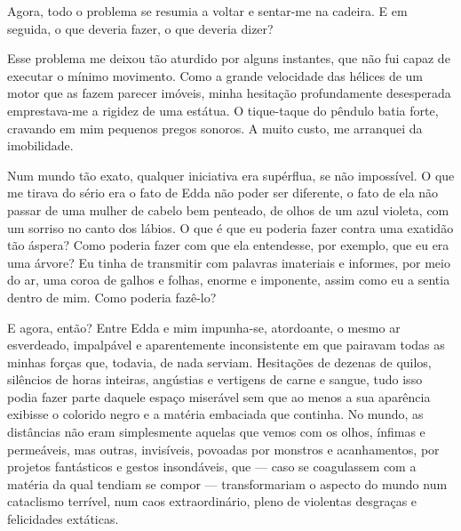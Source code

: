Agora, todo o problema se resumia a voltar e sentar-me na cadeira. E em
seguida, o que deveria fazer, o que deveria dizer?

Esse problema me deixou tão aturdido por alguns instantes, que não fui capaz
 de executar o mínimo movimento. Como a grande velocidade das hélices de um
 motor que as fazem parecer imóveis, minha hesitação profundamente desesperada
 emprestava-me a rigidez de uma estátua. O tique-taque do pêndulo batia forte,
 cravando em mim pequenos pregos sonoros. A muito custo, me arranquei da
 imobilidade. 


Num mundo tão exato, qualquer iniciativa era supérflua, se não impossível. O
que me tirava do sério era o fato de Edda não poder ser diferente, o fato de
ela não passar de uma mulher de cabelo bem penteado, de olhos de um azul
violeta, com um sorriso no canto dos lábios. O que é que eu poderia fazer
contra uma exatidão tão áspera? Como poderia fazer com que ela entendesse,
por exemplo, que eu era uma árvore? Eu tinha de transmitir com palavras
imateriais e informes, por meio do ar, uma coroa de galhos e folhas, enorme e
imponente, assim como eu a sentia dentro de mim. Como poderia fazê-lo?


E agora, então? Entre Edda e mim impunha-se, atordoante, o mesmo ar
esverdeado, impalpável e aparentemente inconsistente em que pairavam todas as
minhas forças que, todavia, de nada serviam. Hesitações de dezenas de quilos,
silêncios de horas inteiras, angústias e vertigens de carne e sangue, tudo
isso podia fazer parte daquele espaço miserável sem que ao menos a sua
aparência exibisse o colorido negro e a matéria embaciada que continha. No
mundo, as distâncias não eram simplesmente aquelas que vemos com os olhos,
ínfimas e permeáveis, mas outras, invisíveis, povoadas por monstros e
acanhamentos, por projetos fantásticos e gestos insondáveis, que --- caso se
coagulassem com a matéria da qual tendiam se compor --- transformariam o
aspecto do mundo num cataclismo terrível, num caos extraordinário, pleno de
violentas desgraças e felicidades extáticas.

